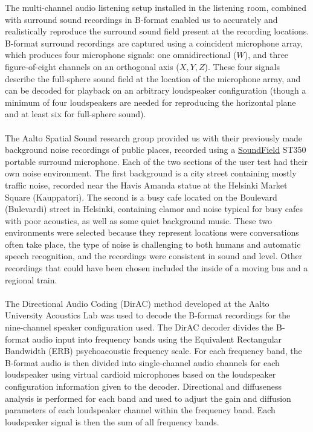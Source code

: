 \documentclass[english, 12pt, a4paper, pdftex, elec, utf8]{aaltothesis}
\begin{document}
The multi-channel audio listening setup installed in the listening room, combined with surround sound recordings in B-format enabled us to accurately and realistically reproduce the surround sound field present at the recording locations. B-format surround recordings are captured using a coincident microphone array, which produces four microphone signals: one omnidirectional ($W$), and three figure-of-eight channels on an orthogonal axis ($X,Y,Z$). These four signals describe the full-sphere sound field at the location of the microphone array, and can be decoded for playback on an arbitrary loudspeaker configuration (though a minimum of four loudspeakers are needed for reproducing the horizontal plane and at least six for full-sphere sound). \cite[p.~287--290]{furness1990ambisonics, pulkki2015communication} \\\\
The Aalto Spatial Sound research group provided us with their previously made background noise recordings of public places, recorded using a \href{http://www.soundfield.com/}{SoundField} ST350 portable surround microphone. Each of the two sections of the user test had their own noise environment. The first background is a city street containing mostly traffic noise, recorded near the Havis Amanda statue at the Helsinki Market Square (Kauppatori). The second is a busy cafe located on the Boulevard (Bulevardi) street in Helsinki, containing clamor and noise typical for busy cafes with poor acoustics, as well as some quiet background music. These two environments were selected because they represent locations were conversations often take place, the type of noise is challenging to both humans and automatic speech recognition, and the recordings were consistent in sound and level. Other recordings that could have been chosen included the inside of a moving bus and a regional train. \\\\ 
The Directional Audio Coding (DirAC) method developed at the Aalto University Acoustics Lab was used to decode the B-format recordings for the nine-channel speaker configuration used. The DirAC decoder divides the B-format audio input into frequency bands using the Equivalent Rectangular Bandwidth (ERB) psychoacoustic frequency scale. For each frequency band, the B-format audio is then divided into single-channel audio channels for each loudspeaker using virtual cardioid microphones based on the loudspeaker configuration information given to the decoder. Directional and diffuseness analysis is performed for each band and used to adjust the gain and diffusion parameters of each loudspeaker channel within the frequency band. Each loudspeaker signal is then the sum of all frequency bands. \cite[p.~291--292]{pulkki2006directional, pulkki2015communication} \\\\
\end{document}

